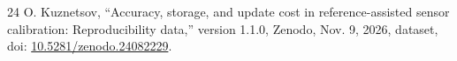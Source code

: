 \begin{thebibliography}{24}
 O. Kuznetsov, ``Accuracy, storage, and update cost in reference-assisted sensor calibration: Reproducibility data,'' version 1.1.0, Zenodo, Nov. 9, 2026, dataset, doi: \href{https://doi.org/10.5281/zenodo.24082229}{10.5281/zenodo.24082229}.

\end{thebibliography}
